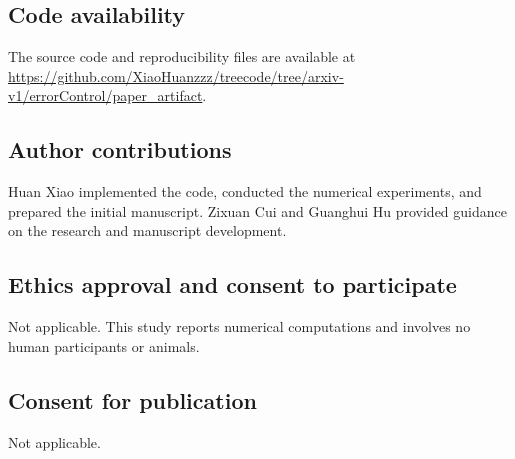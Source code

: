 \documentclass[a4paper,pdflatex,sn-mathphys-num]{sn-jnl}
\theoremstyle{thmstyleone}
\newcommand{\printbibliography}{%
}
\begin{document}
\subsection*{Code availability}
The source code and reproducibility files are available at
\url{https://github.com/XiaoHuanzzz/treecode/tree/arxiv-v1/errorControl/paper_artifact}.

\subsection*{Author contributions}
Huan Xiao implemented the code, conducted the numerical experiments, and prepared the initial manuscript. Zixuan Cui and Guanghui Hu provided guidance on the research and manuscript development.

\subsection*{Ethics approval and consent to participate}
Not applicable. This study reports numerical computations and involves no human participants or animals.

\subsection*{Consent for publication}
Not applicable.

\printbibliography
\end{document}
